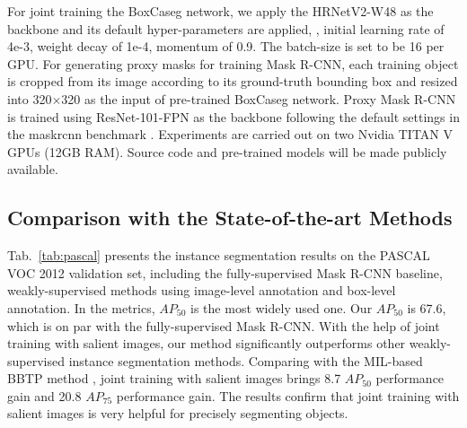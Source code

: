 \documentclass[final]{cvpr}
\begin{document}
For joint training the BoxCaseg network, we apply the HRNetV2-W48 \cite{wang2020deep} as the backbone and its default hyper-parameters are applied, \ie, initial learning rate of 4e-3, weight decay of 1e-4, momentum of 0.9. The batch-size is set to be 16 per GPU. For generating proxy masks for training Mask R-CNN, each training object is cropped from its image according to its ground-truth bounding box and resized into 320$\times$320 as the input of pre-trained BoxCaseg network. Proxy Mask R-CNN is trained using ResNet-101-FPN \cite{he2016deep} as the backbone following the default settings in the maskrcnn benchmark \cite{massa2018mrcnn}. Experiments are carried out on two Nvidia TITAN V GPUs (12GB RAM). Source code and pre-trained models will be made publicly available.




\vspace{-1mm}
\subsection{Comparison with the State-of-the-art Methods}
\vspace{-1mm}

Tab.~\ref{tab:pascal} presents the instance segmentation results on the PASCAL VOC 2012 validation set, including the fully-supervised Mask R-CNN baseline, weakly-supervised methods using image-level annotation and box-level annotation. In the metrics, $AP_{50}$ is the most widely used one. Our $AP_{50}$ is 67.6, which is on par with the fully-supervised Mask R-CNN. With the help of joint training with salient images, our method significantly outperforms other weakly-supervised instance segmentation methods. Comparing with the MIL-based BBTP method \cite{hsu2019weakly}, joint training with salient images brings 8.7 $AP_{50}$ performance gain and 20.8 $AP_{75}$ performance gain. The results confirm that joint training with salient images is very helpful for precisely segmenting objects.
\end{document}
